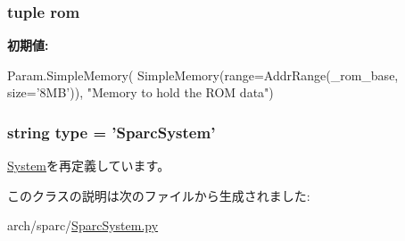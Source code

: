 \label{classSparcSystem_1_1SparcSystem_a103bf48ad3f4f84eca7df4e8dd88377b}
\hypertarget{classSparcSystem_1_1SparcSystem_a5fef0da57edbb35c242e2e5bc1a1235d}{
\subsubsection[{rom}]{\setlength{\rightskip}{0pt plus 5cm}tuple rom}}
\label{classSparcSystem_1_1SparcSystem_a5fef0da57edbb35c242e2e5bc1a1235d}
{\bfseries 初期値:}
\begin{DoxyCode}
Param.SimpleMemory(
        SimpleMemory(range=AddrRange(_rom_base, size='8MB')),
            "Memory to hold the ROM data")
\end{DoxyCode}
\hypertarget{classSparcSystem_1_1SparcSystem_acce15679d830831b0bbe8ebc2a60b2ca}{
\subsubsection[{type}]{\setlength{\rightskip}{0pt plus 5cm}string type = '{\bf SparcSystem}'}}
\label{classSparcSystem_1_1SparcSystem_acce15679d830831b0bbe8ebc2a60b2ca}


\hyperlink{classSystem_1_1System_acce15679d830831b0bbe8ebc2a60b2ca}{System}を再定義しています。

このクラスの説明は次のファイルから生成されました:\begin{DoxyCompactItemize}
\item 
arch/sparc/\hyperlink{SparcSystem_8py}{SparcSystem.py}\end{DoxyCompactItemize}

